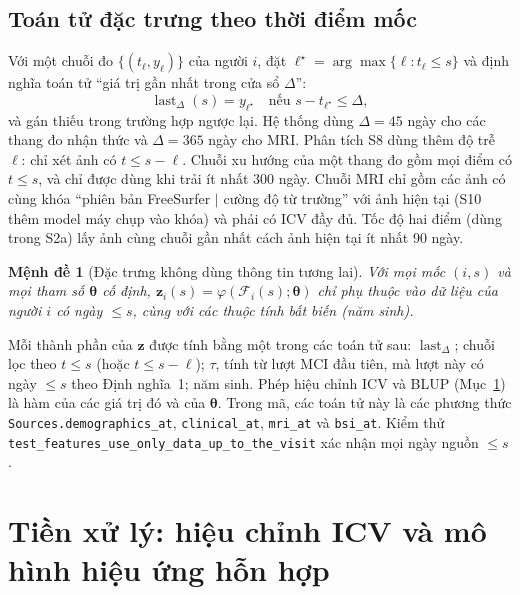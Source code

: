 \documentclass[journal]{IEEEtran}
\newtheorem{proposition}{Mệnh đề}
\newcommand{\code}[1]{\texttt{#1}}
\begin{document}
\subsection{Toán tử đặc trưng theo thời điểm mốc}
Với một chuỗi đo $\{(t_\ell,y_\ell)\}$ của người $i$, đặt $\ell^\star=\arg\max\{\ell: t_\ell\le s\}$ và định nghĩa toán tử ``giá trị gần nhất trong cửa sổ $\Delta$'':
\begin{equation}\label{eq:last}
\operatorname{last}_\Delta(s) = y_{\ell^\star}\quad\text{nếu } s-t_{\ell^\star}\le\Delta,
\end{equation}
và gán thiếu trong trường hợp ngược lại. Hệ thống dùng $\Delta=45$ ngày cho các thang đo nhận thức và $\Delta=365$ ngày cho MRI. Phân tích S8 dùng thêm độ trễ $\ell$: chỉ xét ảnh có $t\le s-\ell$. Chuỗi xu hướng của một thang đo gồm mọi điểm có $t\le s$, và chỉ được dùng khi trải ít nhất 300 ngày. Chuỗi MRI chỉ gồm các ảnh có cùng khóa ``phiên bản FreeSurfer $|$ cường độ từ trường'' với ảnh hiện tại (S10 thêm model máy chụp vào khóa) và phải có ICV đầy đủ. Tốc độ hai điểm (dùng trong S2a) lấy ảnh cùng chuỗi gần nhất cách ảnh hiện tại ít nhất 90 ngày.

\begin{proposition}[Đặc trưng không dùng thông tin tương lai]\label{prop:nofuture}
Với mọi mốc $(i,s)$ và mọi tham số $\bm\theta$ cố định, $\bm z_i(s)=\varphi(\mathcal F_i(s);\bm\theta)$ chỉ phụ thuộc vào dữ liệu của người $i$ có ngày $\le s$, cùng với các thuộc tính bất biến (năm sinh).
\end{proposition}
\begin{IEEEproof}
Mỗi thành phần của $\bm z$ được tính bằng một trong các toán tử sau: $\operatorname{last}_\Delta$; chuỗi lọc theo $t\le s$ (hoặc $t\le s-\ell$); $\tau$, tính từ lượt MCI đầu tiên, mà lượt này có ngày $\le s$ theo Định nghĩa~1; năm sinh. Phép hiệu chỉnh ICV và BLUP (Mục~\ref{sec:prep}) là hàm của các giá trị đó và của $\bm\theta$. Trong mã, các toán tử này là các phương thức \code{Sources.demographics\_at}, \code{clinical\_at}, \code{mri\_at} và \code{bsi\_at}. Kiểm thử \code{test\_features\_use\_only\_data\_up\_to\_the\_visit} xác nhận mọi ngày nguồn $\le s$.
\end{IEEEproof}

\section{Tiền xử lý: hiệu chỉnh ICV và mô hình hiệu ứng hỗn hợp}\label{sec:prep}
\end{document}
